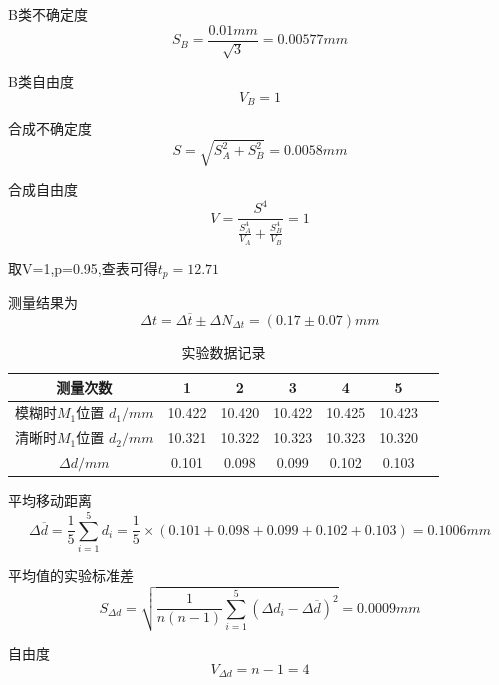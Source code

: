 \documentclass[12pt,a4paper,UTF8]{ctexart}
\begin{document}
B类不确定度
\begin{equation*}
	S_B=\frac{0.01mm}{\sqrt{3}}=0.00577mm
\end{equation*}

B类自由度
\begin{equation*}
	V_B=1
\end{equation*}

合成不确定度
\begin{equation*}
	S= \sqrt{S_A^2+S_B^2}=0.0058mm
\end{equation*}

合成自由度
\begin{equation*}
	V=\frac{S^4}{ \frac{S_A^4}{V_A}+ \frac{S_B^4}{V_B}}=1
\end{equation*}

取V=1,p=0.95,查表可得$t_p=12.71$

测量结果为
\begin{equation*}
	\varDelta t=\varDelta \overline{t}\pm \varDelta N_{\varDelta t}=(0.17\pm0.07)mm
\end{equation*}


\begin{table}[htbp]
	\centering
	\caption{实验数据记录}
	\begin{tabular}{ccccccc}
	\toprule
    测量次数 & 1 & 2 & 3 & 4 & 5  \\
	\midrule
    模糊时$M_1$位置 $d_1/mm$ & 10.422 & 10.420 & 10.422 & 10.425 & 10.423 \\
    清晰时$M_1$位置 $d_2/mm $ & 10.321 & 10.322 & 10.323 & 10.323 & 10.320 \\
	$\varDelta d /mm$ & 0.101 & 0.098 & 0.099 & 0.102 & 0.103 \\
	\bottomrule
	\end{tabular}%
	\label{tab:device}%
\end{table}%

平均移动距离
\begin{equation*}
	\varDelta \overline{d}= \frac{1}{5}\sum_{i = 1}^{5}  d_i=\frac{1}{5} \times (0.101 + 0.098 + 0.099 + 0.102 + 0.103)=0.1006mm
\end{equation*} 

平均值的实验标准差
\begin{equation*}
	S_{\varDelta d}=\sqrt{\frac{1}{n(n-1)}\sum_{i = 1}^{5}(\varDelta d_i-\varDelta \overline{d})^{2}} =0.0009mm
\end{equation*}

自由度
\begin{equation*}
	V_{\varDelta d}=n-1=4
\end{equation*}
\end{document}
